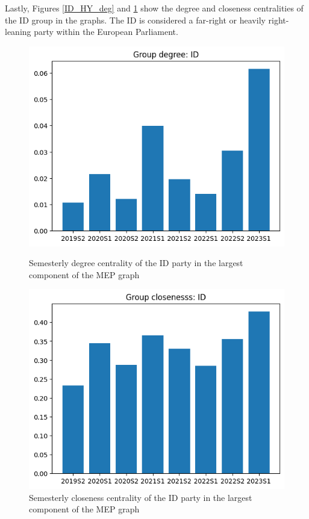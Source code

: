 \documentclass[lettersize,journal]{IEEEtran}
\begin{document}
Lastly, Figures \ref{ID_HY_deg} and \ref{ID_HY_cls} show the degree and closeness centralities of the ID group in the graphs. The ID is considered a far-right or heavily right-leaning party within the European Parliament.

\begin{figure}[h]
  \centering
  \begin{minipage}[b]{0.23\textwidth}
    \includegraphics[width=\textwidth]{ID_HY_deg.png}
    \caption{Semesterly degree centrality of the ID party in the largest component of the MEP graph}
    \label{ID_HY_deg}
  \end{minipage}
  \hfill
  \begin{minipage}[b]{0.23\textwidth}
    \includegraphics[width=\textwidth]{ID_HY_cls.png}
    \caption{Semesterly closeness centrality of the ID party in the largest component of the MEP graph}
    \label{ID_HY_cls}
  \end{minipage}
\end{figure}
\end{document}
